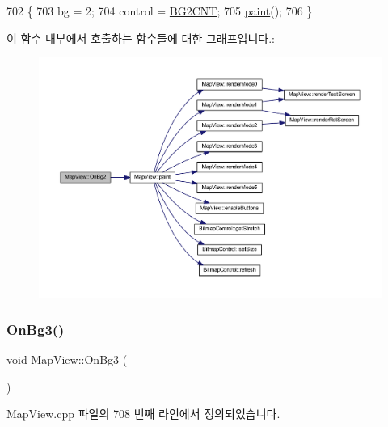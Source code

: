 \begin{DoxyCode}
702 \{
703   bg = 2;
704   control = \mbox{\hyperlink{_globals_8cpp_ad0659703e38445ba2d4959ffe4eb6e5b}{BG2CNT}};
705   \mbox{\hyperlink{class_map_view_a89edf3053cffa4a68516178dbd987339}{paint}}();
706 \}
\end{DoxyCode}
이 함수 내부에서 호출하는 함수들에 대한 그래프입니다.\+:
\nopagebreak
\begin{figure}[H]
\begin{center}
\leavevmode
\includegraphics[width=350pt]{class_map_view_a886ec2fa23dba5da34cdbc6f004c1bea_cgraph}
\end{center}
\end{figure}
\mbox{\label{class_map_view_a1d3dab96b11cbe494f45f4d1bc86331f}} 
\subsubsection{\texorpdfstring{On\+Bg3()}{OnBg3()}}
{\footnotesize\ttfamily void Map\+View\+::\+On\+Bg3 (\begin{DoxyParamCaption}{ }\end{DoxyParamCaption})\hspace{0.3cm}{\ttfamily [protected]}}



Map\+View.\+cpp 파일의 708 번째 라인에서 정의되었습니다.


